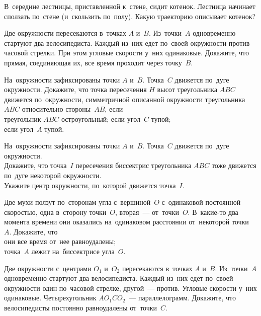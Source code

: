 


\begin{problems}

\item
В~середине лестницы, приставленной к~стене, сидит котенок.
Лестница начинает сползать по~стене (и~скользить по~полу).
Какую траекторию описывает котенок?

\item
Две окружности пересекаются в~точках $A$ и~$B$.
Из~точки~$A$ одновременно стартуют два велосипедиста.
Каждый из~них едет по~своей окружности против часовой стрелки.
При этом угловые скорости у~них одинаковые.
Докажите, что прямая, соединяющая их, все время проходит через точку~$B$.

\item
На~окружности зафиксированы точки $A$ и~$B$.
Точка~$C$ движется по~дуге окружности.
Докажите, что точка пересечения $H$ высот треугольника $ABC$ движется
по~окружности, симметричной описанной окружности треугольника $ABC$
относительно стороны~$AB$, если
\\
\subproblem треугольник $ABC$ остроугольный;
\qquad
\subproblem если угол~$C$ тупой;
\\
\subproblem если угол~$A$ тупой.

\item
На~окружности зафиксированы точки $A$ и~$B$.
Точка~$C$ движется по~дуге окружности.
\\
\subproblem
Докажите, что точка~$I$ пересечения биссектрис треугольника $ABC$ тоже движется
по~дуге некоторой окружности.
\\
\subproblem
Укажите центр окружности, по~которой движется точка~$I$.

\item
Две мухи ползут по~сторонам угла с~вершиной~$O$ с~одинаковой постоянной
скоростью, одна в~сторону точки~$O$, вторая~--- от~точки~$O$.
В~какие-то два момента времени они оказались на~одинаковом расстоянии
от~некоторой точки~$A$.
Докажите, что
\\
\subproblem
они все время от~нее равноудалены;
\\
\subproblem
точка~$A$ лежит на~биссектрисе угла~$O$.

\item
Две окружности с~центрами $O_1$ и~$O_2$ пересекаются в~точках $A$ и~$B$.
Из~точки~$A$ одновременно стартуют два велосипедиста.
Каждый из~них едет по~своей окружности один по~часовой стрелке,
другой~--- против.
Угловые скорости у~них одинаковые.
Четырехугольник $A O_1 C O_2$~--- параллелограмм.
Докажите, что велосипедисты постоянно равноудалены от~точки~$C$.


\end{problems}

